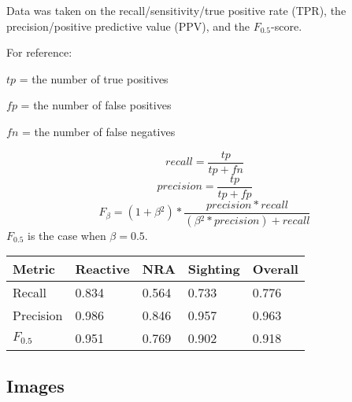 \documentclass{article}
\begin{document}
Data was taken on the recall/sensitivity/true positive rate (TPR), the precision/positive predictive value (PPV),
and the \(F_{0.5}\)-score.

For reference:

\(tp\) = the number of true positives

\(fp\) = the number of false positives

\(fn\) = the number of false negatives

\[recall = \frac{tp}{tp + fn}\]
\[precision = \frac{tp}{tp + fp}\]
\[F_{\beta} = (1 + \beta{}^2) * \frac{precision * recall}{(\beta{}^2 * precision) + recall}\]
\(F_{0.5}\) is the case when \(\beta = 0.5\).

\begin{center}
    \begin{tabular}{ | l || l | l | l || l |}
    \hline
    Metric & Reactive & NRA & Sighting & Overall\\ \hline
    Recall      & 0.834 & 0.564 & 0.733 & 0.776\\ \hline
    Precision   & 0.986 & 0.846 & 0.957 & 0.963\\ \hline
    \(F_{0.5}\) & 0.951 & 0.769 & 0.902 & 0.918\\ \hline
    \end{tabular}
\end{center}

\subsection{Images}
\label{ssec:images}

\newcommand{\showsteps}[1] {
    \begin{figure}[htb]
    \begin{minipage}[b]{0.5\linewidth}
      \centering
      \centerline{\texttt{[image: out\_1\_\#1]}}
      \centerline{(1) Selected region}\medskip
    \end{minipage}%
    \begin{minipage}[b]{0.5\linewidth}
      \centering
      \centerline{\texttt{[image: out\_2\_\#1]}}
      \centerline{(2) Preprocessing performed}\medskip
    \end{minipage}
    
    \begin{minipage}[b]{0.5\linewidth}
      \centering
      \centerline{\texttt{[image: out\_3\_\#1]}}
      \centerline{(3) Canny edge map}\medskip
    \end{minipage}%
    \begin{minipage}[b]{0.5\linewidth}
      \centering
      \centerline{\texttt{[image: out\_4\_\#1]}}
      \centerline{(4) Resulting circles}\medskip
    \end{minipage}
    \caption{State of target#1.jpg through the process}
    \label{fig:res}
    \end{figure}
}
\end{document}
